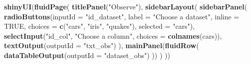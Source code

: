 \documentclass[
]{article}
\newenvironment{Shaded}{\begin{snugshade}}{\end{snugshade}}
\newcommand{\AttributeTok}[1]{\textcolor[rgb]{0.13,0.29,0.53}{#1}}
\newcommand{\ConstantTok}[1]{\textcolor[rgb]{0.56,0.35,0.01}{#1}}
\newcommand{\ControlFlowTok}[1]{\textcolor[rgb]{0.13,0.29,0.53}{\textbf{#1}}}
\newcommand{\DecValTok}[1]{\textcolor[rgb]{0.00,0.00,0.81}{#1}}
\newcommand{\FunctionTok}[1]{\textcolor[rgb]{0.13,0.29,0.53}{\textbf{#1}}}
\newcommand{\NormalTok}[1]{#1}
\newcommand{\OtherTok}[1]{\textcolor[rgb]{0.56,0.35,0.01}{#1}}
\newcommand{\SpecialCharTok}[1]{\textcolor[rgb]{0.81,0.36,0.00}{\textbf{#1}}}
\newcommand{\StringTok}[1]{\textcolor[rgb]{0.31,0.60,0.02}{#1}}
\begin{document}
\begin{Shaded}
\begin{Highlighting}[]
\FunctionTok{shinyUI}\NormalTok{(}\FunctionTok{fluidPage}\NormalTok{(}
  \FunctionTok{titlePanel}\NormalTok{(}\StringTok{"Observe"}\NormalTok{),}
  \FunctionTok{sidebarLayout}\NormalTok{(}
    \FunctionTok{sidebarPanel}\NormalTok{(}
      \FunctionTok{radioButtons}\NormalTok{(}\AttributeTok{inputId =} \StringTok{"id\_dataset"}\NormalTok{, }\AttributeTok{label =} \StringTok{"Choose a dataset"}\NormalTok{, }\AttributeTok{inline =} \ConstantTok{TRUE}\NormalTok{,}
                   \AttributeTok{choices =} \FunctionTok{c}\NormalTok{(}\StringTok{"cars"}\NormalTok{, }\StringTok{"iris"}\NormalTok{, }\StringTok{"quakes"}\NormalTok{), }\AttributeTok{selected =} \StringTok{"cars"}\NormalTok{),}
      \FunctionTok{selectInput}\NormalTok{(}\StringTok{"id\_col"}\NormalTok{, }\StringTok{"Choose a column"}\NormalTok{, }\AttributeTok{choices =} \FunctionTok{colnames}\NormalTok{(cars)),}
      \FunctionTok{textOutput}\NormalTok{(}\AttributeTok{outputId =} \StringTok{"txt\_obs"}\NormalTok{)}
\NormalTok{    ),}
    \FunctionTok{mainPanel}\NormalTok{(}\FunctionTok{fluidRow}\NormalTok{(}
      \FunctionTok{dataTableOutput}\NormalTok{(}\AttributeTok{outputId =} \StringTok{"dataset\_obs"}\NormalTok{)}
\NormalTok{    ))}
\NormalTok{  )}
\NormalTok{))}
\end{Highlighting}
\end{Shaded}

\begin{Shaded}
\end{Shaded}
\end{document}
